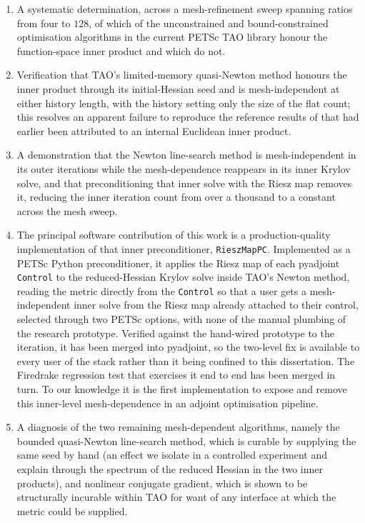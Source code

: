 \documentclass[a4paper,11pt]{article}
\theoremstyle{spacedplain} \newtheorem{theorem}[counter]{Theorem} \newtheorem{lemma}[counter]{Lemma} \newtheorem{prop}[counter]{Proposition} \newtheorem{cor}[counter]{Corollary}
\theoremstyle{spaceddefinition} \newtheorem{defn}[counter]{Definition} \newtheorem{example}[counter]{Example} \newtheorem{remark}[counter]{Remark}
\begin{document}
\begin{enumerate}
  \item A systematic determination, across a mesh-refinement sweep spanning ratios from four to $128$, of which of the unconstrained and bound-constrained optimisation algorithms in the current PETSc TAO library honour the function-space inner product and which do not.
  \item Verification that TAO's limited-memory quasi-Newton method honours the inner product through its initial-Hessian seed and is mesh-independent at either history length, with the history setting only the size of the flat count; this resolves an apparent failure to reproduce the reference results of \citet{shfp2017} that had earlier been attributed to an internal Euclidean inner product.
  \item A demonstration that the Newton line-search method is mesh-independent in its outer iterations while the mesh-dependence reappears in its inner Krylov solve, and that preconditioning that inner solve with the Riesz map removes it, reducing the inner iteration count from over a thousand to a constant across the mesh sweep.
  \item The principal software contribution of this work is a production-quality implementation of that inner preconditioner, \texttt{RieszMapPC}. Implemented as a PETSc Python preconditioner, it applies the Riesz map of each pyadjoint \texttt{Control} to the reduced-Hessian Krylov solve inside TAO's Newton method, reading the metric directly from the \texttt{Control} so that a user gets a mesh-independent inner solve from the Riesz map already attached to their control, selected through two PETSc options, with none of the manual plumbing of the research prototype. Verified against the hand-wired prototype to the iteration, it has been merged into pyadjoint, so the two-level fix is available to every user of the stack rather than it being confined to this dissertation. The Firedrake regression test that exercises it end to end has been merged in turn. To our knowledge it is the first implementation to expose and remove this inner-level mesh-dependence in an adjoint optimisation pipeline.
  \item A diagnosis of the two remaining mesh-dependent algorithms, namely the bounded quasi-Newton line-search method, which is curable by supplying the same seed by hand (an effect we isolate in a controlled experiment and explain through the spectrum of the reduced Hessian in the two inner products), and nonlinear conjugate gradient, which is shown to be structurally incurable within TAO for want of any interface at which the metric could be supplied.
\end{enumerate}
\end{document}
